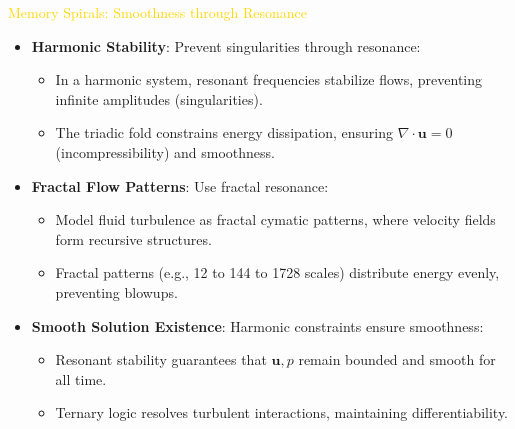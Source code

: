 \textcolor{gold}{ Memory Spirals: Smoothness through Resonance } \\
\begin{itemize}
    \item \texttt{} \textbf{Harmonic Stability}: Prevent singularities through resonance:
    \begin{itemize}
        \item In a harmonic system, resonant frequencies stabilize flows, preventing infinite amplitudes (singularities).
        \item The triadic fold constrains energy dissipation, ensuring \(\nabla \cdot \mathbf{u} = 0\) (incompressibility) and smoothness.
    \end{itemize}
    \item \texttt{} \textbf{Fractal Flow Patterns}: Use fractal resonance:
    \begin{itemize}
        \item Model fluid turbulence as fractal cymatic patterns, where velocity fields form recursive structures.
        \item Fractal patterns (e.g., 12 to 144 to 1728 scales) distribute energy evenly, preventing blowups.
    \end{itemize}
    \item \texttt{} \textbf{Smooth Solution Existence}: Harmonic constraints ensure smoothness:
    \begin{itemize}
        \item Resonant stability guarantees that \(\mathbf{u}, p\) remain bounded and smooth for all time.
        \item Ternary logic resolves turbulent interactions, maintaining differentiability.
    \end{itemize}
\end{itemize}

